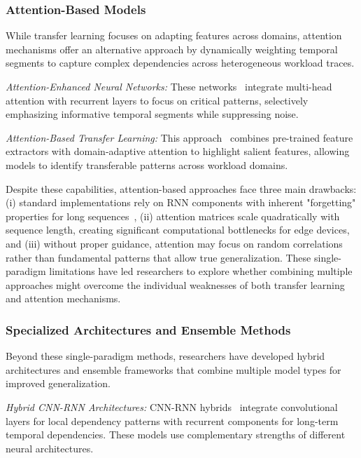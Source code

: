 \subsubsection{Attention-Based Models}

While transfer learning focuses on adapting features across domains, attention mechanisms offer an alternative approach by dynamically weighting temporal segments to capture complex dependencies across heterogeneous workload traces.

\textit{Attention-Enhanced Neural Networks:} These networks~\cite{zhang2022attention} integrate multi-head attention with recurrent layers to focus on critical patterns, selectively emphasizing informative temporal segments while suppressing noise.

\textit{Attention-Based Transfer Learning:} This approach~\cite{li2022robust} combines pre-trained feature extractors with domain-adaptive attention to highlight salient features, allowing models to identify transferable patterns across workload domains.

Despite these capabilities, attention-based approaches face three main drawbacks: (i) standard implementations rely on \ac{RNN} components with inherent "forgetting" properties for long sequences~\cite{zhou2021informer}, (ii) attention matrices scale quadratically with sequence length, creating significant computational bottlenecks for edge devices, and (iii) without proper guidance, attention may focus on random correlations rather than fundamental patterns that allow true generalization. These single-paradigm limitations have led researchers to explore whether combining multiple approaches might overcome the individual weaknesses of both transfer learning and attention mechanisms.

\subsubsection{Specialized Architectures and Ensemble Methods}

Beyond these single-paradigm methods, researchers have developed hybrid architectures and ensemble frameworks that combine multiple model types for improved generalization.

\textit{Hybrid \ac{CNN}-\ac{RNN} Architectures:} \ac{CNN}-\ac{RNN} hybrids~\cite{lai2018modelinglongshorttermtemporal} integrate convolutional layers for local dependency patterns with recurrent components for long-term temporal dependencies. These models use complementary strengths of different neural architectures.

